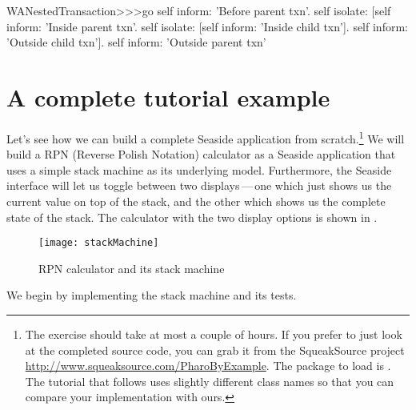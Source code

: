 \documentclass[a4paper,10pt,twoside]{book}
\begin{document}
\begin{code}{}
WANestedTransaction>>>go
	self inform: 'Before parent txn'.
	self isolate:
			[self inform: 'Inside parent txn'.
			self isolate: [self inform: 'Inside child txn'].
			self inform: 'Outside child txn'].
	self inform: 'Outside parent txn'
\end{code}


\section{A complete tutorial example}


Let's see how we can build a complete Seaside application from scratch.\footnote{The
exercise should take at most a couple of hours. If you prefer to just look at the
completed source code, you can grab it from the SqueakSource project
\url{http://www.squeaksource.com/PharoByExample}.
The package to load is . The tutorial that follows uses slightly
different class names so that you can compare your implementation with ours.}
We will build a RPN (Reverse Polish Notation) calculator as a Seaside application that
uses a simple stack machine as its underlying model.
Furthermore, the Seaside interface will let us toggle between two displays\,---\,one
which just shows us the current value on top of the stack, and the other which shows us
the complete state of the stack.
The calculator with the two display options is shown in .

\begin{figure}[ht]
\begin{center}
\texttt{[image: stackMachine]}
\caption{RPN calculator and its stack machine}
\end{center}
\end{figure}

We begin by implementing the stack machine and its tests.
\end{document}
